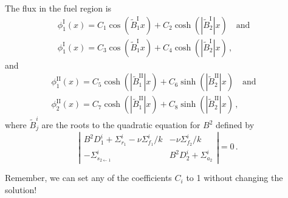 \documentclass[compact]{ne630handout}
\begin{document}
\begin{handoutflow}
The flux in the fuel region is \[
\begin{aligned}
  \phi^{\text{I}}_1(x) =   C_1 \cos(\tilde{B}^{\text{I}}_1 x) + C_2 \cosh(|\tilde{B}^{\text{I}}_2| x)
   \quad \text{and} \quad \\
  \phi^{\text{I}}_1(x) = C_3 \cos(\tilde{B}^{\text{I}}_1 x) + C_4 \cosh(|\tilde{B}^{\text{I}}_2| x)  \, ,
\end{aligned}
\] and \[
\begin{aligned}
  \phi^{\text{II}}_1(x) = C_5 \cosh(|\tilde{B}^{\text{II}}_1| x) + C_6 \sinh(|\tilde{B}^{\text{II}}_2| x)
   \quad \text{and} \quad \\
   \phi^{\text{II}}_2(x) = C_7 \cosh(|\tilde{B}^{\text{II}}_1| x) + C_8 \sinh(|\tilde{B}^{\text{II}}_2| x) \, ,
\end{aligned}
\] where \(\tilde{B}^{i}_j\) are the roots to the quadratic equation for \(B^2\) defined by \[
  \left | \begin{matrix}
    B^2 D^{i}_1 + \Sigma^{i}_{r_1} - \nu\Sigma^{i}_{f_1}/k & -\nu\Sigma_{f_2}^{i}/k \\
    -\Sigma^{i}_{s_{2\gets 1}} & B^2 D^{i}_2 + \Sigma^{i}_{a_2}
   \end{matrix} \right | = 0 \, .
\]

Remember, we can set any of the coefficients \(C_i\) to 1 without changing the solution!

\end{handoutflow}
\end{document}
